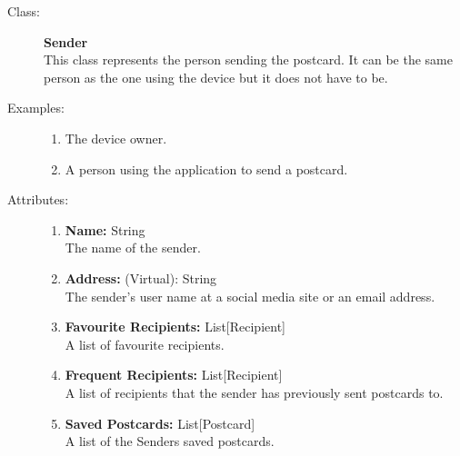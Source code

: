 \documentclass[10pt,a4paper]{article}
\begin{document}
\begin{description}
\item[Class:] \textbf{Sender} \hfill \\
This class represents the person sending the postcard. It can be the same person as the one using the device but it does not have to be.

\item[Examples:] \hfill
\begin{enumerate}
\item The device owner.
\item A person using the application to send a postcard.
\end{enumerate}

\item[Attributes:] \hfill
\begin{enumerate}
\item \textbf{Name:} String \hfill \\The name of the sender. 
\item \textbf{Address:} (Virtual): String \hfill \\The sender's user name at a social media site or an email address.
\item \textbf{Favourite Recipients:} List[Recipient] \hfill \\A list of favourite recipients.
\item \textbf{Frequent Recipients:} List[Recipient] \hfill \\A list of recipients that the sender has previously sent postcards to.
\item \textbf{Saved Postcards:} List[Postcard] \hfill \\A list of the Senders saved postcards.
\end{enumerate}
\end{description}

\hrulefill
\end{document}
